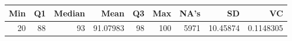 
\begin{tabular}[t]{rrrrrrrrr}
\toprule
Min & Q1 & Median & Mean & Q3 & Max & NA's & SD & VC\\
\midrule
20 & 88 & 93 & 91.07983 & 98 & 100 & 5971 & 10.45874 & 0.1148305\\
\bottomrule
\end{tabular}
